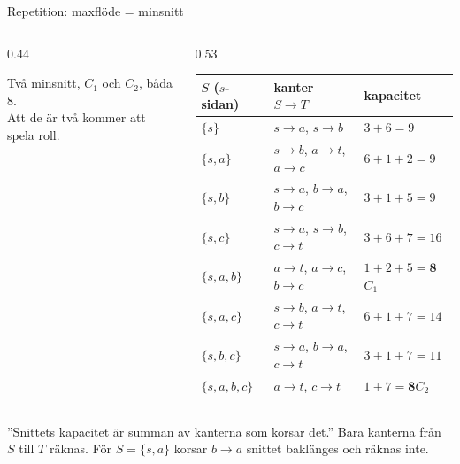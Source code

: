 \begin{frame}{Repetition: maxflöde = minsnitt}
\begin{columns}[T]
\begin{column}{0.44\textwidth}
\centering
\par\smallskip
\footnotesize Två minsnitt, $C_1$ och $C_2$, båda 8.\\ Att de är två kommer att spela roll.
\end{column}
\begin{column}{0.53\textwidth}
\footnotesize
\renewcommand{\arraystretch}{1.1}
\begin{tabular}{@{}lll@{}}
\toprule
$S$ ($s$-sidan) & kanter $S\to T$ & kapacitet\\
\midrule
$\{s\}$ & $s{\to}a$, $s{\to}b$ & $3+6=9$\\
$\{s,a\}$ & $s{\to}b$, $a{\to}t$, $a{\to}c$ & $6+1+2=9$\\
$\{s,b\}$ & $s{\to}a$, $b{\to}a$, $b{\to}c$ & $3+1+5=9$\\
$\{s,c\}$ & $s{\to}a$, $s{\to}b$, $c{\to}t$ & $3+6+7=16$\\
\rowcolor{plum!12} $\{s,a,b\}$ & $a{\to}t$, $a{\to}c$, $b{\to}c$ & $1+2+5=\mathbf{8}$\enspace$C_1$\\
$\{s,a,c\}$ & $s{\to}b$, $a{\to}t$, $c{\to}t$ & $6+1+7=14$\\
$\{s,b,c\}$ & $s{\to}a$, $b{\to}a$, $c{\to}t$ & $3+1+7=11$\\
\rowcolor{plum!12} $\{s,a,b,c\}$ & $a{\to}t$, $c{\to}t$ & $1+7=\mathbf{8}$\enspace$C_2$\\
\bottomrule
\end{tabular}
\end{column}
\end{columns}
\vfill
\begin{missbox}
”Snittets kapacitet är summan av kanterna som korsar det.” Bara kanterna från $S$ till $T$
räknas. För $S=\{s,a\}$ korsar $b\to a$ snittet baklänges och räknas inte.
\end{missbox}
\end{frame}

